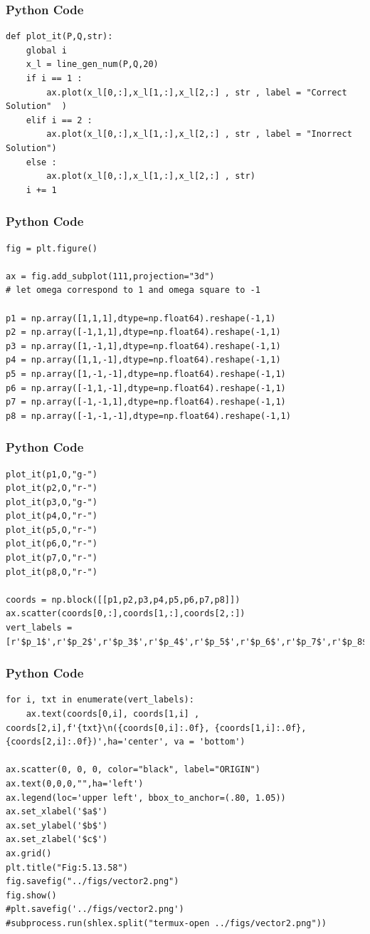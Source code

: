 \documentclass{beamer}
\begin{document}
\begin{frame}[fragile]
    \frametitle{Python Code}
    \begin{lstlisting}
def plot_it(P,Q,str):
    global i 
    x_l = line_gen_num(P,Q,20)
    if i == 1 : 
        ax.plot(x_l[0,:],x_l[1,:],x_l[2,:] , str , label = "Correct Solution"  )
    elif i == 2 :
        ax.plot(x_l[0,:],x_l[1,:],x_l[2,:] , str , label = "Inorrect Solution")
    else :
        ax.plot(x_l[0,:],x_l[1,:],x_l[2,:] , str)
    i += 1 
\end{lstlisting}
\end{frame}
\begin{frame}[fragile]
    \frametitle{Python Code}
    \begin{lstlisting}
fig = plt.figure()

ax = fig.add_subplot(111,projection="3d")
# let omega correspond to 1 and omega square to -1 

p1 = np.array([1,1,1],dtype=np.float64).reshape(-1,1)
p2 = np.array([-1,1,1],dtype=np.float64).reshape(-1,1)
p3 = np.array([1,-1,1],dtype=np.float64).reshape(-1,1)
p4 = np.array([1,1,-1],dtype=np.float64).reshape(-1,1)
p5 = np.array([1,-1,-1],dtype=np.float64).reshape(-1,1)
p6 = np.array([-1,1,-1],dtype=np.float64).reshape(-1,1)
p7 = np.array([-1,-1,1],dtype=np.float64).reshape(-1,1)
p8 = np.array([-1,-1,-1],dtype=np.float64).reshape(-1,1)
\end{lstlisting}
\end{frame}
\begin{frame}[fragile]
    \frametitle{Python Code}
    \begin{lstlisting}
plot_it(p1,O,"g-")
plot_it(p2,O,"r-")
plot_it(p3,O,"g-")
plot_it(p4,O,"r-")
plot_it(p5,O,"r-")
plot_it(p6,O,"r-")
plot_it(p7,O,"r-")
plot_it(p8,O,"r-")

coords = np.block([[p1,p2,p3,p4,p5,p6,p7,p8]])
ax.scatter(coords[0,:],coords[1,:],coords[2,:])
vert_labels = [r'$p_1$',r'$p_2$',r'$p_3$',r'$p_4$',r'$p_5$',r'$p_6$',r'$p_7$',r'$p_8$']

\end{lstlisting}
\end{frame}
\begin{frame}[fragile]
    \frametitle{Python Code}
    \begin{lstlisting}
for i, txt in enumerate(vert_labels):
    ax.text(coords[0,i], coords[1,i] , coords[2,i],f'{txt}\n({coords[0,i]:.0f}, {coords[1,i]:.0f}, {coords[2,i]:.0f})',ha='center', va = 'bottom')
        
ax.scatter(0, 0, 0, color="black", label="ORIGIN")
ax.text(0,0,0,"",ha='left')
ax.legend(loc='upper left', bbox_to_anchor=(.80, 1.05))
ax.set_xlabel('$a$')
ax.set_ylabel('$b$')
ax.set_zlabel('$c$')
ax.grid()
plt.title("Fig:5.13.58")
fig.savefig("../figs/vector2.png")
fig.show()
#plt.savefig('../figs/vector2.png')
#subprocess.run(shlex.split("termux-open ../figs/vector2.png"))
\end{lstlisting}
\end{frame}
\end{document}
